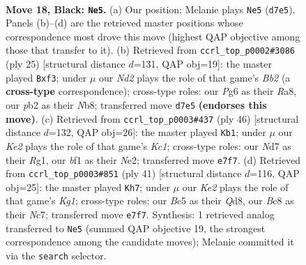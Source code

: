 \documentclass[11pt]{article}
\begin{document}
\begin{figure}[p]\centering
\begin{subfigure}{0.46\textwidth}\centering
\resizebox{\linewidth}{!}{%
\newchessgame
\chessboard[
  setfen={rnbq1r2/pp1nk3/6p1/2b3P1/P3Q3/2N2N2/1P3P2/R1B1KB1R b KQ - 3 18},
  showmover=false,
  pgfstyle=straightmove, color=movearrow, markmove={d7-e5}
]}
\caption{}
\end{subfigure}\hfill
\begin{subfigure}{0.46\textwidth}\centering
\resizebox{\linewidth}{!}{%
\newchessgame
\chessboard[
  setfen={rn1qk2r/1b1n1ppp/4p3/p7/2BP4/Q3PN1P/5PP1/RN2K2R b KQkq - 0 13},
  showmover=false,
  pgfstyle=straightmove, color=movearrow, markmove={b7-f3}
]}
\caption{}
\end{subfigure}
\\[4pt]
\begin{subfigure}{0.46\textwidth}\centering
\resizebox{\linewidth}{!}{%
\newchessgame
\chessboard[
  setfen={r2qk1n1/pp3p2/2p2n1b/3p4/3P2b1/P1NBP3/1PQBN2r/2K2RR1 w q - 6 24},
  showmover=false,
  pgfstyle=straightmove, color=movearrow, markmove={c1-b1}
]}
\caption{}
\end{subfigure}\hfill
\begin{subfigure}{0.46\textwidth}\centering
\resizebox{\linewidth}{!}{%
\newchessgame
\chessboard[
  setfen={3qr1k1/2n2pb1/r2p1n1p/2p2P2/P7/1RN1BN1P/1P1Q2P1/5RK1 b - - 2 21},
  showmover=false,
  pgfstyle=straightmove, color=movearrow, markmove={g8-h7}
]}
\caption{}
\end{subfigure}
\caption{\textbf{Move 18, Black: \texttt{Ne5}.} (a) Our position; Melanie plays \texttt{Ne5} (\texttt{d7e5}). Panels (b)--(d) are the retrieved master positions whose correspondence most drove this move (highest QAP objective among those that transfer to it). (b) Retrieved from \texttt{ccrl\_top\_p0002\#3086} (ply 25) [structural distance $d$=131, QAP obj=19]: the master played \texttt{Bxf3}; under $\mu$ our \emph{Nd2} plays the role of that game's \emph{Bb2} (a \textbf{cross-type} correspondence); cross-type roles: our \emph{P}g6 as their \emph{R}a8, our \emph{p}b2 as their \emph{N}b8; transferred move \texttt{d7e5} \textbf{(endorses this move)}. (c) Retrieved from \texttt{ccrl\_top\_p0003\#437} (ply 46) [structural distance $d$=132, QAP obj=26]: the master played \texttt{Kb1}; under $\mu$ our \emph{Ke2} plays the role of that game's \emph{Kc1}; cross-type roles: our \emph{N}d7 as their \emph{R}g1, our \emph{b}f1 as their \emph{N}e2; transferred move \texttt{e7f7}. (d) Retrieved from \texttt{ccrl\_top\_p0003\#851} (ply 41) [structural distance $d$=116, QAP obj=25]: the master played \texttt{Kh7}; under $\mu$ our \emph{Ke2} plays the role of that game's \emph{Kg1}; cross-type roles: our \emph{B}c5 as their \emph{Q}d8, our \emph{B}c8 as their \emph{N}c7; transferred move \texttt{e7f7}. Synthesis: 1 retrieved analog transferred to \texttt{Ne5} (summed QAP objective 19, the strongest correspondence among the candidate moves); Melanie committed it via the \texttt{search} selector.}
\label{fig:thought-m35}
\end{figure}
\end{document}
